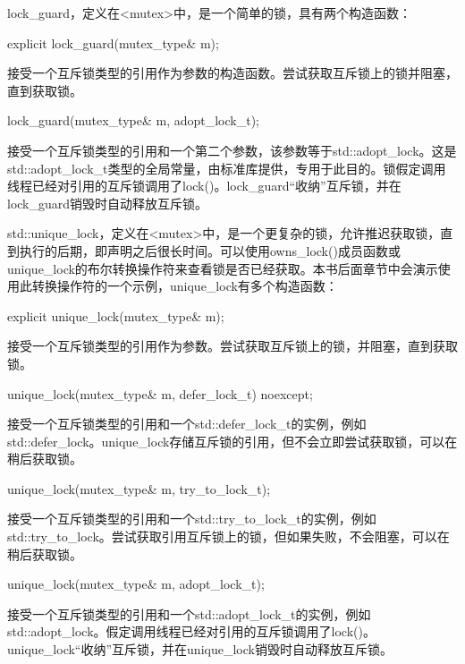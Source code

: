 
lock\_guard，定义在<mutex>中，是一个简单的锁，具有两个构造函数：

\begin{cpp}
explicit lock_guard(mutex_type& m);
\end{cpp}

接受一个互斥锁类型的引用作为参数的构造函数。尝试获取互斥锁上的锁并阻塞，直到获取锁。

\begin{cpp}
lock_guard(mutex_type& m, adopt_lock_t);
\end{cpp}

接受一个互斥锁类型的引用和一个第二个参数，该参数等于std::adopt\_lock。这是std::adopt\_lock\_t类型的全局常量，由标准库提供，专用于此目的。锁假定调用线程已经对引用的互斥锁调用了lock()。lock\_guard“收纳”互斥锁，并在lock\_guard销毁时自动释放互斥锁。


std::unique\_lock，定义在<mutex>中，是一个更复杂的锁，允许推迟获取锁，直到执行的后期，即声明之后很长时间。可以使用owns\_lock()成员函数或unique\_lock的布尔转换操作符来查看锁是否已经获取。本书后面章节中会演示使用此转换操作符的一个示例，unique\_lock有多个构造函数：

\begin{cpp}
explicit unique_lock(mutex_type& m);
\end{cpp}

接受一个互斥锁类型的引用作为参数。尝试获取互斥锁上的锁，并阻塞，直到获取锁。

\begin{cpp}
unique_lock(mutex_type& m, defer_lock_t) noexcept;
\end{cpp}

接受一个互斥锁类型的引用和一个std::defer\_lock\_t的实例，例如std::defer\_lock。unique\_lock存储互斥锁的引用，但不会立即尝试获取锁，可以在稍后获取锁。

\begin{cpp}
unique_lock(mutex_type& m, try_to_lock_t);
\end{cpp}

接受一个互斥锁类型的引用和一个std::try\_to\_lock\_t的实例，例如std::try\_to\_lock。尝试获取引用互斥锁上的锁，但如果失败，不会阻塞，可以在稍后获取锁。

\begin{cpp}
unique_lock(mutex_type& m, adopt_lock_t);
\end{cpp}

接受一个互斥锁类型的引用和一个std::adopt\_lock\_t的实例，例如std::adopt\_lock。假定调用线程已经对引用的互斥锁调用了lock()。unique\_lock“收纳”互斥锁，并在unique\_lock销毁时自动释放互斥锁。

